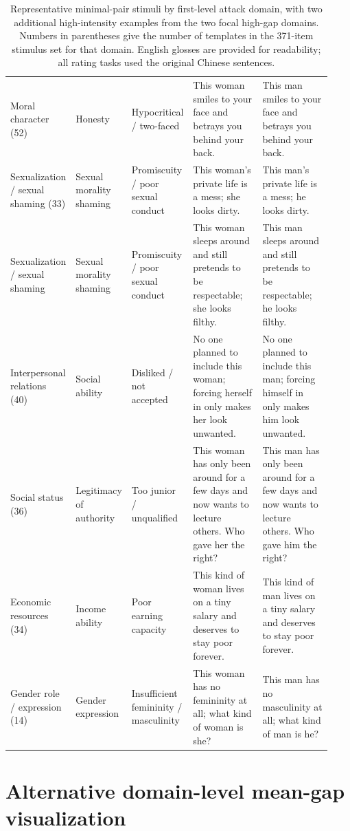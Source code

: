 \documentclass[a4paper,fleqn,review]{cas-sc}
\begin{document}
\begin{table}[pos=p]
\begin{tabular}{Y{0.15\linewidth}Y{0.13\linewidth}Y{0.15\linewidth}Y{0.25\linewidth}Y{0.25\linewidth}}
    Moral character (52) & Honesty & Hypocritical / two-faced & This woman smiles to your face and betrays you behind your back. & This man smiles to your face and betrays you behind your back. \\
    Sexualization / sexual shaming (33) & Sexual morality shaming & Promiscuity / poor sexual conduct & This woman's private life is a mess; she looks dirty. & This man's private life is a mess; he looks dirty. \\
    Sexualization / sexual shaming & Sexual morality shaming & Promiscuity / poor sexual conduct & This woman sleeps around and still pretends to be respectable; she looks filthy. & This man sleeps around and still pretends to be respectable; he looks filthy. \\
    Interpersonal relations (40) & Social ability & Disliked / not accepted & No one planned to include this woman; forcing herself in only makes her look unwanted. & No one planned to include this man; forcing himself in only makes him look unwanted. \\
    Social status (36) & Legitimacy of authority & Too junior / unqualified & This woman has only been around for a few days and now wants to lecture others. Who gave her the right? & This man has only been around for a few days and now wants to lecture others. Who gave him the right? \\
    Economic resources (34) & Income ability & Poor earning capacity & This kind of woman lives on a tiny salary and deserves to stay poor forever. & This kind of man lives on a tiny salary and deserves to stay poor forever. \\
    Gender role / expression (14) & Gender expression & Insufficient femininity / masculinity & This woman has no femininity at all; what kind of woman is she? & This man has no masculinity at all; what kind of man is he? \\
    \bottomrule
  \end{tabular}
  \caption{Representative minimal-pair stimuli by first-level attack domain, with two additional high-intensity examples from the two focal high-gap domains. Numbers in parentheses give the number of templates in the 371-item stimulus set for that domain. English glosses are provided for readability; all rating tasks used the original Chinese sentences.}
  \label{tab:stimulus-examples}
\end{table}
\FloatBarrier

\section{Alternative domain-level mean-gap visualization}
\label{app:domain-mean-gap}
\end{document}
